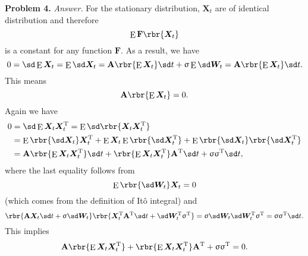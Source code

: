 \documentclass[english, nochinese]{pnote}
\DeclareMathOperator\ope{\mathrm{E}}
\begin{document}
\textbf{Problem 4.} \textit{Answer.} For the stationary distribution, $\bm{X}_t$ are of identical distribution and therefore
\begin{equation}
\ope \mathbf{F} \rbr{\bm{X}_t}
\end{equation}
is a constant for any function $\mathbf{F}$. As a result, we have
\begin{equation}
0 = \sd \ope \bm{X}_t = \ope \sd \bm{X}_t = \mathbf{A} \rbr{ \ope \bm{X}_t } \sd t + \upsigma \ope \sd \bm{W}_t = \mathbf{A} \rbr{ \ope \bm{X}_t } \sd t.
\end{equation}
This means
\begin{equation}
\mathbf{A} \rbr{ \ope \bm{X}_t } = 0.
\end{equation}
Again we have
\begin{equation}
\begin{split}
0 &= \sd \ope \bm{X}_t \bm{X}_t^{\text{T}} = \ope \sd \rbr{ \bm{X}_t \bm{X}_t^{\text{T}} } \\
&= \ope \rbr{ \sd \bm{X}_t } \bm{X}_t^{\text{T}} + \ope \bm{X}_t \ope \rbr{ \sd \bm{X}_t^{\text{T}} } + \ope \rbr{ \sd \bm{X}_t } \rbr{ \sd \bm{X}_t^{\text{T}} } \\
&= \mathbf{A} \rbr{ \ope \bm{X}_t \bm{X}_t^{\text{T}} } \sd t + \rbr{ \ope \bm{X}_t \bm{X}_t^{\text{T}} } \mathbf{A}^{\text{T}} \sd t + \upsigma \upsigma^{\text{T}} \sd t,
\end{split}
\end{equation}
where the last equality follows from
\begin{equation}
\ope \rbr{ \sd \bm{W}_t } \bm{X}_t = 0
\end{equation}
(which comes from the definition of It\^o integral) and
\begin{equation}
\rbr{ \mathbf{A} \bm{X}_t \sd t + \upsigma \sd \bm{W}_t } \rbr{ \bm{X}_t^{\text{T}} \mathbf{A}^{\text{T}} \sd t + \sd \bm{W}_t^{\text{T}} \upsigma^{\text{T}} } = \upsigma \sd \bm{W}_t \sd \bm{W}_t^{\text{T}} \upsigma^{\text{T}} = \upsigma \upsigma^{\text{T}} \sd t.
\end{equation}
This implies
\begin{equation}
\mathbf{A} \rbr{ \ope \bm{X}_t \bm{X}_t^{\text{T}} } + \rbr{ \ope \bm{X}_t \bm{X}_t^{\text{T}} } \mathbf{A}^{\text{T}} + \upsigma \upsigma^{\text{T}} = 0.
\end{equation}
\end{document}
